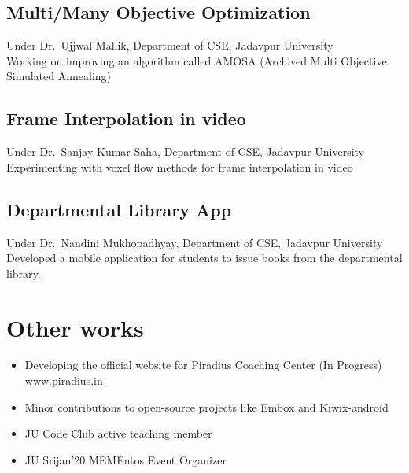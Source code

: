 \documentclass[]{deedy-resume-openfont}
\begin{document}
\begin{minipage}[t]{0.55\textwidth}
\subsection{Multi/Many Objective Optimization}
Under Dr.\ Ujjwal Mallik, 
Department of CSE, Jadavpur University\\
Working on improving an algorithm called AMOSA
(Archived Multi Objective Simulated Annealing)
\sectionsep


\subsection{Frame Interpolation in video}
Under Dr.\ Sanjay Kumar Saha,
Department of CSE, Jadavpur University\\
Experimenting with voxel flow methods for frame interpolation in video
\sectionsep

\subsection{Departmental Library App}
Under Dr.\ Nandini Mukhopadhyay,
Department of CSE, Jadavpur University\\
Developed a mobile application for students to issue books from
the departmental library.
\sectionsep

\section{Other works} 
\begin{itemize}
\item Developing the official website for Piradius Coaching Center (In Progress)
\\\href{https:\\www.piradius.in}{www.piradius.in}
\item Minor contributions to open-source projects like Embox and Kiwix-android
\item JU Code Club active teaching member
\item JU Srijan'20 MEMEntos Event Organizer
\end{itemize}


\end{minipage} 
\hfill
\end{document}

